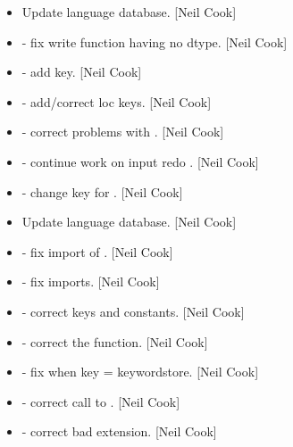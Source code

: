 \documentclass[a4paper,10pt,english]{report}
\begin{document}
\begin{itemize}
\item {} 
Update language database. {[}Neil Cook{]}

\item {} 
 - fix write function having no dtype. {[}Neil Cook{]}

\item {} 
 - add  key. {[}Neil
Cook{]}

\item {} 
 - add/correct loc keys. {[}Neil Cook{]}

\item {} 
 - correct problems with . {[}Neil Cook{]}

\item {} 
 - continue work on input redo . {[}Neil Cook{]}

\item {} 
 - change key for . {[}Neil Cook{]}

\item {} 
Update language database. {[}Neil Cook{]}

\item {} 
 - fix import of . {[}Neil Cook{]}

\item {} 
 - fix imports. {[}Neil Cook{]}

\item {} 
 - correct keys and constants. {[}Neil
Cook{]}

\item {} 
 - correct the  function. {[}Neil Cook{]}

\item {} 
 - fix when key = keywordstore. {[}Neil Cook{]}

\item {} 
 - correct call to . {[}Neil Cook{]}

\item {} 
 - correct bad extension. {[}Neil Cook{]}


\end{itemize}
\end{document}
